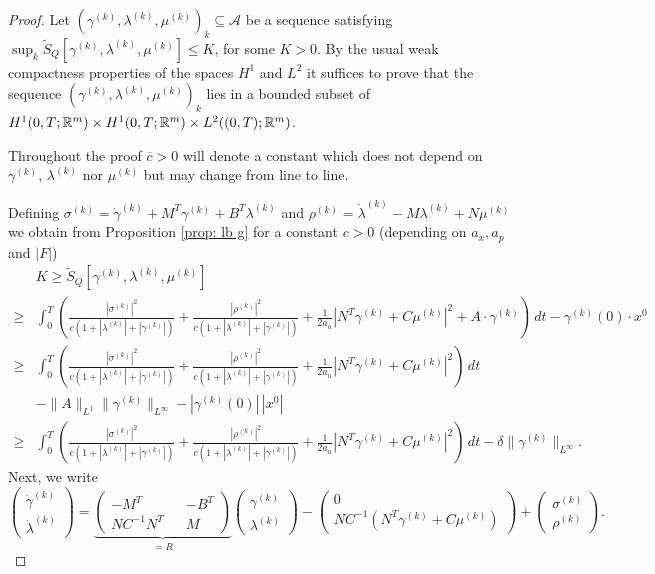 \documentclass[11pt]{article}
\begin{document}
\begin{proof}
Let $(\gamma^{(k)},\lambda^{(k)}, \mu^{(k)})_k \subseteq \mathcal{A}$ be a sequence satisfying $\sup_k \tilde{S}_Q[\gamma^{(k)},\lambda^{(k)}, \mu^{(k)}] \leq K$, for some $K>0$.
By the usual weak compactness properties of the spaces $H^1$ and $L^2$ it suffices to prove that the sequence $(\gamma^{(k)},\lambda^{(k)}, \mu^{(k)})_k$ lies in a bounded subset of $H^1(0,T; \mathbb R^m) \times H^1(0,T; \mathbb R^m) \times L^2((0,T); \mathbb R^m)$.

Throughout the proof $\overline{c}>0$ will denote a constant which does not depend on $\gamma^{(k)}$, $\lambda^{(k)}$ nor $\mu^{(k)}$ but may change from line to line.

Defining $\sigma^{(k)} = \dot{\gamma}^{(k)} + M^T\gamma^{(k)} + B^T \lambda^{(k)}$ and $\rho^{(k)} = \dot{\lambda}^{(k)} - M \lambda^{(k)}  + N \mu^{(k)}$ we obtain from Proposition \ref{prop: lb g} for a constant $c>0$ (depending on $a_x, a_p$ and $|F|$)
\begin{align}
&K \geq \tilde{S}_Q[\gamma^{(k)},\lambda^{(k)}, \mu^{(k)}]  \label{eq: est coer dual} \\
\geq &\int_0^T \left( \frac{|\sigma^{(k)}|^2}{c(1 + |\lambda^{(k)}| + |\gamma^{(k)}|)} + \frac{|\rho^{(k)} |^2}{c(1 + |\lambda^{(k)}| + |\gamma^{(k)}|)} + \frac1{2a_u} |N^T\gamma^{(k)} + C \mu^{(k)}|^2 + A\cdot \gamma^{(k)} \right)  \, dt - \gamma^{(k)}(0)\cdot x^0 \nonumber \\
\geq &\int_0^T \left( \frac{|\sigma^{(k)}|^2}{c(1 + |\lambda^{(k)}| +  |\gamma^{(k)}|)} + \frac{|\rho^{(k)} |^2}{c(1 + |\lambda^{(k)}| + |\gamma^{(k)}|)} + \frac1{2a_u} |N^T\gamma^{(k)} + C \mu^{(k)}|^2 \right)  \, dt \nonumber  \\
& - \|A\|_{L^1} \| \gamma^{(k)}\|_{L^{\infty}} - |\gamma^{(k)}(0)| \, |x^0| \nonumber \\
\geq &\int_0^T \left( \frac{|\sigma^{(k)}|^2}{c(1 + |\lambda^{(k)}| +  |\gamma^{(k)}|)} + \frac{|\rho^{(k)} |^2}{c(1 + |\lambda^{(k)}| +  |\gamma^{(k)}|)} + \frac1{2a_u} |N^T\gamma^{(k)} + C \mu^{(k)}|^2 \right)  \, dt - \delta \| \gamma^{(k)} \|_{L^{\infty}}. \nonumber
\end{align}
Next, we write
\begin{equation}\label{eq: rep derivative}
\begin{pmatrix}
    \dot{\gamma}^{(k)} \\ \dot{\lambda}^{(k)}
\end{pmatrix} = \underbrace{\begin{pmatrix} -M^T && - B^T \\ N C^{-1}N^T &&  M \end{pmatrix}}_{= R} \begin{pmatrix} \gamma^{(k)} \\ \lambda^{(k)} \end{pmatrix} - \begin{pmatrix} 0 \\ N C^{-1} ( N^T\gamma^{(k)} + C\mu^{(k)}) \end{pmatrix} +  \begin{pmatrix} \sigma^{(k)} \\ \rho^{(k)} \end{pmatrix}.

\end{equation}
\end{proof}
\end{document}
